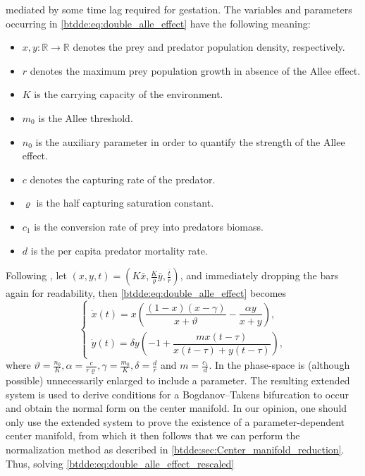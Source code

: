 mediated by some time lag required for gestation.
The variables and parameters occurring in \cref{btdde:eq:double_alle_effect}
have the following meaning:
\begin{itemize}
\item $x,y\colon \mathbb R \rightarrow \mathbb R$ denotes the prey and predator population density, respectively.
\item $r$ denotes the maximum prey population growth in absence of the Allee effect.
\item $K$ is the carrying capacity of the environment.
\item $m_0$ is the Allee threshold.
\item $n_0$ is the auxiliary parameter in order to quantify the strength of the Allee effect.
\item $c$ denotes the capturing rate of the predator.
\item $\varrho$ is the half capturing saturation constant.
\item $c_1$ is the conversion rate of prey into predators biomass.
\item $d$ is the per capita predator mortality rate.
\end{itemize}
Following \cite{Jiao2021}, let $(x,y,t) = \left(K\bar x, \frac K \varrho \bar y, \frac{\bar t}r\right)$, and immediately 
dropping the bars again for readability, then \cref{btdde:eq:double_alle_effect} becomes
\begin{equation}
\label{btdde:eq:double_alle_effect_rescaled}
\begin{cases}
    \dot x(t) = x \left( \dfrac{(1-x)(x-\gamma)}{x+\vartheta} - \dfrac{\alpha y}{x+y} \right), \\
    \dot y(t) = \delta y \left( -1 + \dfrac{ m x(t-\tau) }{ x(t-\tau) + y(t-\tau) }\right),
\end{cases}
\end{equation}
where $\vartheta = \frac{n_0}K, \alpha=\frac c{r\varrho}, \gamma = \frac{m_0}K, \delta = \frac dr$ and $m=\frac{c_1}d$.
In \cite{Jiao2021} the phase-space is (although possible) unnecessarily
enlarged to include a parameter. The resulting extended system is used to
derive conditions for a Bogdanov--Takens bifurcation to occur and obtain the
normal form on the center manifold. In our opinion, one should only use the
extended system to prove the existence of a parameter-dependent center manifold,
from which it then follows that we can perform the normalization method as
described in \cref{btdde:sec:Center_manifold_reduction}. Thus, solving \cref{btdde:eq:double_alle_effect_rescaled}
